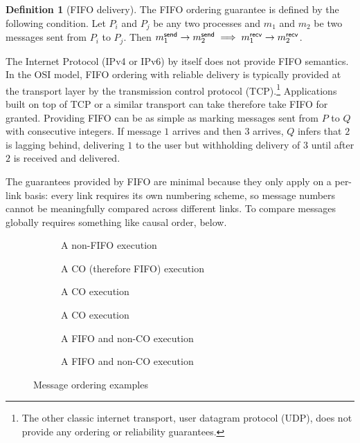 \documentclass[]             %
{NASA}                       %
\theoremstyle{definition}
\newtheorem{definition}[theorem]{Definition}
\begin{document}
\begin{definition}[FIFO delivery]
  \label{def:fifo}
  The FIFO ordering guarantee is defined by the following condition. Let
  $P_i$ and $P_j$ be any two processes and $m_1$ and $m_2$ be two
  messages sent from $P_i$ to $P_j$. Then
  $m_{1}^{\mathsf{send}} \to m_{2}^{\mathsf{send}} \implies m_{1}^{\mathsf{recv}} \to m_{2}^{\mathsf{recv}}$.
\end{definition}

The Internet Protocol (IPv4 or IPv6) by itself does not provide FIFO
semantics. In the OSI model, FIFO ordering with reliable delivery is
typically provided at the transport layer by the transmission control
protocol (TCP).\footnote{The other classic internet transport, user
  datagram protocol (UDP), does not provide any ordering or
  reliability guarantees.} Applications built on top of TCP or a
similar transport can take therefore take FIFO for granted. Providing
FIFO can be as simple as marking messages sent from $P$ to $Q$ with
consecutive integers. If message $1$ arrives and then $3$ arrives, $Q$
infers that $2$ is lagging behind, delivering $1$ to the user but
withholding delivery of $3$ until after $2$ is received and delivered.

The guarantees provided by FIFO are minimal because they only apply on
a per-link basis: every link requires its own numbering scheme, so
message numbers cannot be meaningfully compared across different
links. To compare messages globally requires something like causal
order, below.

\begin{figure}[p]
  \setlength\abovecaptionskip{0ex}
  \setlength\belowcaptionskip{4ex}
  \begin{subfigure}[t]{0.475\textwidth}
    \centering
    
    \caption{A non-FIFO execution}
    \label{fig:ordex-non-fifo}
  \end{subfigure}
  \begin{subfigure}[t]{0.475\textwidth}
  \centering
  
  \caption{A CO (therefore FIFO) execution}
  \label{fig:ordex-co-1}
\end{subfigure}
\begin{subfigure}[b]{0.475\textwidth}
  \centering
  
  \caption{A CO execution}
  \label{fig:ordex-co-2}
\end{subfigure}
\begin{subfigure}[b]{0.475\textwidth}
  \centering
  
  \caption{A CO execution}
  \label{fig:ordex-co-3}
\end{subfigure}
\begin{subfigure}[b]{0.475\textwidth}
  \centering
  
  \caption{A FIFO and non-CO execution}
  \label{fig:ordex-non-co-1}
\end{subfigure}\hfill
\begin{subfigure}[b]{0.475\textwidth}
  \centering
  
  \caption{A FIFO and non-CO execution}
  \label{fig:ordex-non-co-2}
\end{subfigure}
\caption{Message ordering examples}
\label{fig:message-ordering}
\end{figure}
\end{document}
